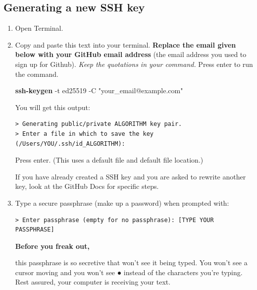 \documentclass[
]{book}
\newenvironment{Shaded}{\begin{snugshade}}{\end{snugshade}}
\newcommand{\AttributeTok}[1]{\textcolor[rgb]{0.13,0.29,0.53}{#1}}
\newcommand{\FunctionTok}[1]{\textcolor[rgb]{0.13,0.29,0.53}{\textbf{#1}}}
\newcommand{\NormalTok}[1]{#1}
\newcommand{\StringTok}[1]{\textcolor[rgb]{0.31,0.60,0.02}{#1}}
\newenvironment{redbox}{
  \definecolor{shadecolor}{RGB}{243, 154, 157}
  \color{white}
  \begin{shaded}}
 {\end{shaded}}
\theoremstyle{definition}
\theoremstyle{definition}
\theoremstyle{definition}
\theoremstyle{definition}
\theoremstyle{remark}
\begin{document}
\subsection{Generating a new SSH key}\label{generating-a-new-ssh-key}

\begin{enumerate}
\def\labelenumi{\arabic{enumi}.}
\item
  Open Terminal.
\item
  Copy and paste this text into your terminal. \textbf{Replace the email given below with your GitHub email address} (the email address you used to sign up for Github). \emph{Keep the quotations in your command.} Press enter to run the command.

\begin{Shaded}
\begin{Highlighting}[]
\FunctionTok{ssh{-}keygen} \AttributeTok{{-}t}\NormalTok{ ed25519 }\AttributeTok{{-}C} \StringTok{"your\_email@example.com"}
\end{Highlighting}
\end{Shaded}

  You will get this output:

\begin{verbatim}
> Generating public/private ALGORITHM key pair.
> Enter a file in which to save the key (/Users/YOU/.ssh/id_ALGORITHM):
\end{verbatim}

  Press enter. (This uses a default file and default file location.)

  If you have already created a SSH key and you are asked to rewrite another key, look at the GitHub Docs for specific steps.
\item
  Type a secure passphrase (make up a password) when prompted with:

\begin{verbatim}
> Enter passphrase (empty for no passphrase): [TYPE YOUR PASSPHRASE]
\end{verbatim}

  \begin{redbox}

  \begin{center}
  \textbf{Before you freak out,}

  \end{center}

  this passphrase is so secretive that won't see it being typed. You won't see a cursor moving and you won't see ● instead of the characters you're typing. Rest assured, your computer is receiving your text.


\end{redbox}
\end{enumerate}
\end{document}
